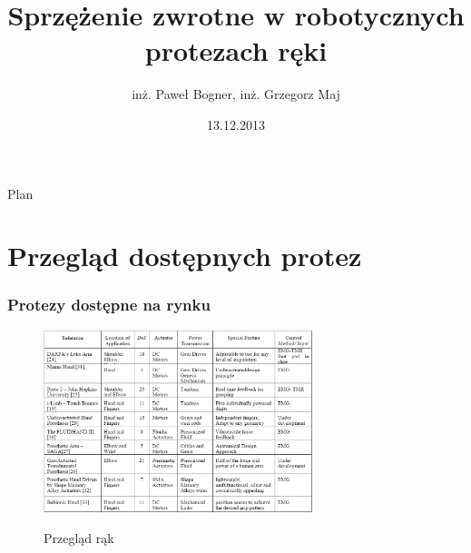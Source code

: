 \documentclass[8pt]{beamer}
\title[Robotyczne protezy ręki, BeBionic]{Sprzężenie zwrotne w robotycznych protezach ręki}
\date[2013]{13.12.2013}
\author[inż. Paweł Bogner, inż. Grzegorz Maj]{inż. Paweł Bogner, inż. Grzegorz Maj}
\institute[PWr]{Politechnika Wrocławska}
\begin{document}
{
\frame{\maketitle}
}

\begin{frame}{Plan}
\begin{multicols}{2}
	\tableofcontents
	\end{multicols}
\end{frame}

\section{Przegląd dostępnych protez}

\begin{frame}%
\frametitle{Protezy dostępne na rynku}
	\begin{center}
		\begin{figure}
			\includegraphics[width=0.7\textwidth]{graphics/hands.jpg}
			\label{graph:hand}	
			\caption{Przegląd rąk \cite{bandara2012upper}}
		\end{figure}
	\end{center}

\end{frame}


 
\end{document}

